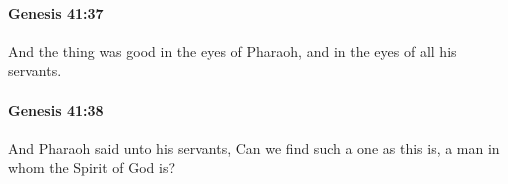 		\paragraph{Genesis 41:37} %
			\label{GENESIS-41-37}

			And the thing was good in the eyes of Pharaoh, and in the eyes of all his servants.


		\paragraph{Genesis 41:38} %
			\label{GENESIS-41-38}

			And Pharaoh said unto his servants, Can we find such a one as this is, a man in whom the Spirit of God is?


